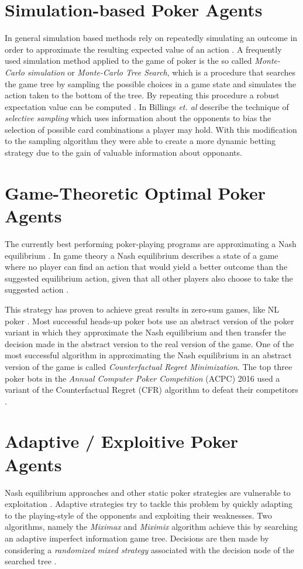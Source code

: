 \section{Simulation-based Poker Agents}
In general simulation based methods rely on repeatedly simulating an outcome in order to approximate the resulting expected value of an action \cite{master_nuno}. A frequently used simulation method applied to the game of poker is the so called \textit{Monte-Carlo simulation} or \textit{Monte-Carlo Tree Search}, which is a procedure that searches the game tree by sampling the possible choices in a game state and simulates the action taken to the bottom of the tree. By repeating this procedure a robust expectation value can be computed \cite{review}. 
In \cite{selective_sampling} Billings \textit{et. al} describe the technique of \textit{selective sampling} which uses information about the opponents to bias the selection of possible card combinations a player may hold. With this modification to the sampling algorithm they were able to create a more dynamic betting strategy due to the gain of valuable information about opponants. 
\section{Game-Theoretic Optimal Poker Agents}
The currently best performing poker-playing programs are approximating a Nash equilibrium \cite{quality_of_bots}.
In game theory a Nash equilibrium describes a state of a game where no player can find an action that would yield a better outcome than the suggested equilibrium action, given that all other players also choose to take the suggested action \cite{game_theory}. \par
This strategy has proven to achieve great results in zero-sum games, like NL  poker \cite{master_nuno}. Most successful heads-up poker bots use an abstract version of the poker variant in which they approximate the Nash equilibrium and then transfer the decision made in the abstract version to the real version of the game. One of the most successful algorithm in approximating the Nash equilibrium in an abstract version of the game is called \textit{Counterfactual Regret Minimization}. The top three poker bots in the \textit{Annual Computer Poker Competition} (ACPC) 2016 used a variant of the Counterfactual Regret (CFR) algorithm to defeat their competitors \cite{quality_of_bots}.
\section{Adaptive / Exploitive Poker Agents}
Nash equilibrium approaches and other static poker strategies are vulnerable to exploitation \cite{master_nuno}.
Adaptive strategies try to tackle this problem by quickly adapting to the playing-style of the opponents and exploiting their weaknesses. Two algorithms, namely the \textit{Miximax} and \textit{Miximix} algorithm achieve this by searching an adaptive imperfect information game tree. Decisions are then made by considering a \textit{randomized mixed strategy} associated with the decision node of the searched tree \cite{billings_phd}.
